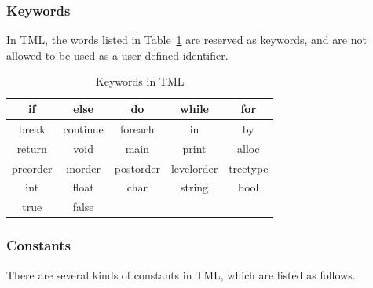 \documentclass[12pt,psfig,a4]{article}
\begin{document}
\subsubsection{Keywords}
In TML, the words listed in Table~\ref{keywords} are reserved as keywords, and are not allowed to be used as a user-defined identifier.

\begin{table}[!ht]
\begin{center}
\begin{tabular}{| c | c | c | c | c |}
\hline
if & else & do & while & for \\
\hline
break & continue & foreach & in & by     \\  %
\hline
return & void & main & print & alloc \\
\hline
preorder & inorder & postorder & levelorder & treetype\\
\hline
int & float & char & string & bool \\
\hline
true & false & & &\\
\hline
\end{tabular}
\caption{Keywords in TML}
\label{keywords}
\end {center}
\end{table}

\subsubsection {Constants}
There are several kinds of constants in TML, which are listed as follows.
\end{document}
